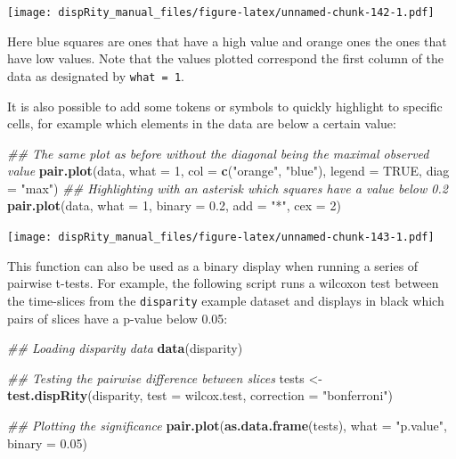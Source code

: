 \documentclass[]{book}
\newenvironment{Shaded}{\begin{snugshade}}{\end{snugshade}}
\newcommand{\CommentTok}[1]{\textcolor[rgb]{0.56,0.35,0.01}{\textit{#1}}}
\newcommand{\DataTypeTok}[1]{\textcolor[rgb]{0.13,0.29,0.53}{#1}}
\newcommand{\DecValTok}[1]{\textcolor[rgb]{0.00,0.00,0.81}{#1}}
\newcommand{\FloatTok}[1]{\textcolor[rgb]{0.00,0.00,0.81}{#1}}
\newcommand{\KeywordTok}[1]{\textcolor[rgb]{0.13,0.29,0.53}{\textbf{#1}}}
\newcommand{\NormalTok}[1]{#1}
\newcommand{\OtherTok}[1]{\textcolor[rgb]{0.56,0.35,0.01}{#1}}
\newcommand{\StringTok}[1]{\textcolor[rgb]{0.31,0.60,0.02}{#1}}
\begin{document}
\texttt{[image: dispRity\_manual\_files/figure-latex/unnamed-chunk-142-1.pdf]}

Here blue squares are ones that have a high value and orange ones the ones that have low values.
Note that the values plotted correspond the first column of the data as designated by \texttt{what\ =\ 1}.

It is also possible to add some tokens or symbols to quickly highlight to specific cells, for example which elements in the data are below a certain value:

\begin{Shaded}
\begin{Highlighting}[]
\CommentTok{## The same plot as before without the diagonal being the maximal observed value}
\KeywordTok{pair.plot}\NormalTok{(data, }\DataTypeTok{what =} \DecValTok{1}\NormalTok{, }\DataTypeTok{col =} \KeywordTok{c}\NormalTok{(}\StringTok{"orange"}\NormalTok{, }\StringTok{"blue"}\NormalTok{), }\DataTypeTok{legend =} \OtherTok{TRUE}\NormalTok{, }\DataTypeTok{diag =} \StringTok{"max"}\NormalTok{)}
\CommentTok{## Highlighting with an asterisk which squares have a value below 0.2}
\KeywordTok{pair.plot}\NormalTok{(data, }\DataTypeTok{what =} \DecValTok{1}\NormalTok{, }\DataTypeTok{binary =} \FloatTok{0.2}\NormalTok{, }\DataTypeTok{add =} \StringTok{"*"}\NormalTok{, }\DataTypeTok{cex =} \DecValTok{2}\NormalTok{)}
\end{Highlighting}
\end{Shaded}

\texttt{[image: dispRity\_manual\_files/figure-latex/unnamed-chunk-143-1.pdf]}

This function can also be used as a binary display when running a series of pairwise t-tests.
For example, the following script runs a wilcoxon test between the time-slices from the \texttt{disparity} example dataset and displays in black which pairs of slices have a p-value below 0.05:

\begin{Shaded}
\begin{Highlighting}[]
\CommentTok{## Loading disparity data}
\KeywordTok{data}\NormalTok{(disparity)}

\CommentTok{## Testing the pairwise difference between slices}
\NormalTok{tests <-}\StringTok{ }\KeywordTok{test.dispRity}\NormalTok{(disparity, }\DataTypeTok{test =}\NormalTok{ wilcox.test, }\DataTypeTok{correction =} \StringTok{"bonferroni"}\NormalTok{)}

\CommentTok{## Plotting the significance}
\KeywordTok{pair.plot}\NormalTok{(}\KeywordTok{as.data.frame}\NormalTok{(tests), }\DataTypeTok{what =} \StringTok{"p.value"}\NormalTok{, }\DataTypeTok{binary =} \FloatTok{0.05}\NormalTok{)}
\end{Highlighting}
\end{Shaded}
\end{document}
